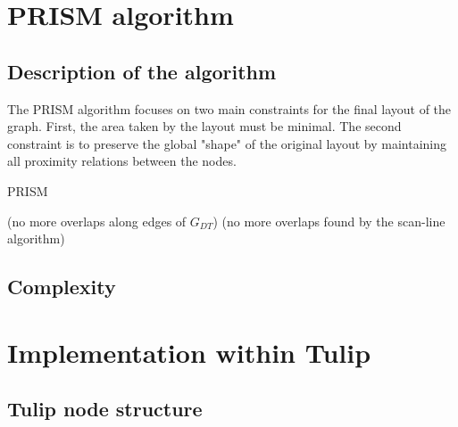 \documentclass[12pt]{report}
\begin{document}
\chapter{PRISM algorithm}

\section{Description of the algorithm}

The PRISM algorithm focuses on two main constraints for the final layout of the graph. First, the area taken by the layout must be minimal. The second constraint is to preserve the global "shape" of the original layout by maintaining all proximity relations between the nodes.



\bigskip
\begin{algorithm}[H]
\caption{PRISM}
	 
(no more overlaps along edges of $G_{DT}$)
\BlankLine
{}	
(no more overlaps found by the scan-line algorithm)
\end{algorithm}

\section{Complexity}

\chapter{Implementation within Tulip}

\section{Tulip node structure}
\end{document}
